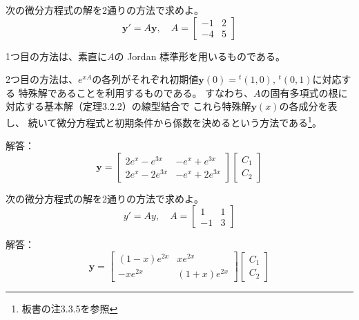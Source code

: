 \documentclass[report]{jlreq}
\begin{document}
\begin{problem}[3.3.6]
    次の微分方程式の解を2通りの方法で求めよ。
    \begin{equation}
        \bm{y}' = A\bm{y},\quad
        A = \begin{bmatrix}
            -1 & 2 \\
            -4 & 5
        \end{bmatrix}
    \end{equation}

    1つ目の方法は、素直に$A$の Jordan 標準形を用いるものである。

    2つ目の方法は、$e^{xA}$の各列がそれぞれ初期値$\bm{y}(0) = {}^t (1, 0),\, {}^t (0, 1)$に対応する
    特殊解であることを利用するものである。
    すなわち、$A$の固有多項式の根に対応する基本解（定理3.2.2）の線型結合で
    これら特殊解$\bm{y}(x)$の各成分を表し、
    続いて微分方程式と初期条件から係数を決めるという方法である\footnote{
        板書の注3.3.5を参照
    }。

    解答：
    \begin{equation}
        \bm{y} = \begin{bmatrix}
            2e^x - e^{3x} & -e^x + e^{3x} \\
            2e^x - 2e^{3x} & -e^x + 2e^{3x}
        \end{bmatrix}
        \begin{bmatrix}
            C_1 \\
            C_2
        \end{bmatrix}
    \end{equation}
\end{problem}

\begin{problem}[3.3.7]
    次の微分方程式の解を2通りの方法で求めよ。
    \begin{equation}
        y' = Ay,\quad
        A = \begin{bmatrix}
            1 & 1 \\
            -1 & 3
        \end{bmatrix}
    \end{equation}

    解答：
    \begin{equation}
        \bm{y} = \begin{bmatrix}
            (1-x) e^{2x} & x e^{2x} \\
            -x e^{2x} & (1+x) e^{2x}
        \end{bmatrix}
        \begin{bmatrix}
            C_1 \\
            C_2
        \end{bmatrix}
    \end{equation}
\end{problem}
\end{document}
